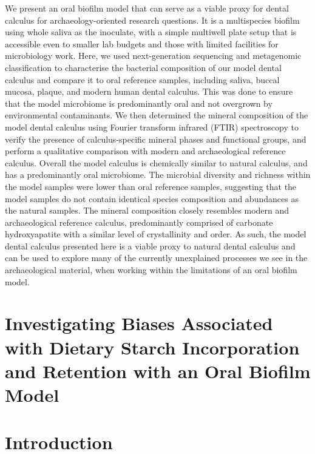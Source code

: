 \documentclass[
  letterpaper,
]{book}
\begin{document}
We present an oral biofilm model that can serve as a viable proxy for
dental calculus for archaeology-oriented research questions. It is a
multispecies biofilm using whole saliva as the inoculate, with a simple
multiwell plate setup that is accessible even to smaller lab budgets and
those with limited facilities for microbiology work. Here, we used
next-generation sequencing and metagenomic classification to
characterise the bacterial composition of our model dental calculus and
compare it to oral reference samples, including saliva, buccal mucosa,
plaque, and modern human dental calculus. This was done to ensure that
the model microbiome is predominantly oral and not overgrown by
environmental contaminants. We then determined the mineral composition
of the model dental calculus using Fourier transform infrared (FTIR)
spectroscopy to verify the presence of calculus-specific mineral phases
and functional groups, and perform a qualitative comparison with modern
and archaeological reference calculus. Overall the model calculus is
chemically similar to natural calculus, and has a predominantly oral
microbiome. The microbial diversity and richness within the model
samples were lower than oral reference samples, suggesting that the
model samples do not contain identical species composition and
abundances as the natural samples. The mineral composition closely
resembles modern and archaeological reference calculus, predominantly
comprised of carbonate hydroxyapatite with a similar level of
crystallinity and order. As such, the model dental calculus presented
here is a viable proxy to natural dental calculus and can be used to
explore many of the currently unexplained processes we see in the
archaeological material, when working within the limitations of an oral
biofilm model.


\hypertarget{investigating-biases-associated-with-dietary-starch-incorporation-and-retention-with-an-oral-biofilm-model}{%
\chapter{Investigating Biases Associated with Dietary Starch
Incorporation and Retention with an Oral Biofilm
Model}\label{investigating-biases-associated-with-dietary-starch-incorporation-and-retention-with-an-oral-biofilm-model}}


\hypertarget{byocstarch-intro}{%
\chapter{Introduction}\label{byocstarch-intro}}
\end{document}
